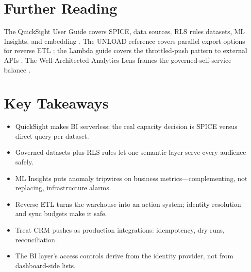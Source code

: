 \section{Further Reading}
The QuickSight User Guide covers SPICE, data sources, RLS rules datasets, ML Insights, and embedding \cite{awsQuickSightDocs}. The UNLOAD reference covers parallel export options for reverse ETL \cite{awsRedshiftUNLOAD}; the Lambda guide covers the throttled-push pattern to external APIs \cite{awsLambdaDocs}. The Well-Architected Analytics Lens frames the governed-self-service balance \cite{awsWellArchitectedAnalytics}.

\section*{Key Takeaways}
\begin{itemize}
    \item QuickSight makes BI serverless; the real capacity decision is SPICE versus direct query per dataset.
    \item Governed datasets plus RLS rules let one semantic layer serve every audience safely.
    \item ML Insights puts anomaly tripwires on business metrics---complementing, not replacing, infrastructure alarms.
    \item Reverse ETL turns the warehouse into an action system; identity resolution and sync budgets make it safe.
    \item Treat CRM pushes as production integrations: idempotency, dry runs, reconciliation.
    \item The BI layer's access controls derive from the identity provider, not from dashboard-side lists.
\end{itemize}

